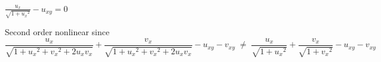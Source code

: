 $\frac{u_x}{\sqrt{1+{u_x}^2}} - u_{xy} = 0$

\soln* Second order nonlinear since
$$\frac{u_x}{\sqrt{1+{u_x}^2+{v_x}^2+2u_xv_x}} + \frac{v_x}{\sqrt{1+{u_x}^2+{v_x}^2+2u_xv_x}}
    - u_{xy} - v_{xy}
    \;\neq\; \frac{u_x}{\sqrt{1+{u_x}^2}} + \frac{v_x}{\sqrt{1+{v_x}^2}} - u_{xy} - v_{xy}$$